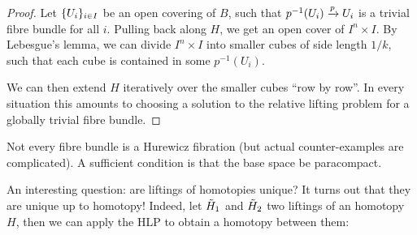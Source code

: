 \begin{proof}
Let $\{U_i\}_{i\in I}$ be an open covering of $B$, such that $p^{-1}(U_i)\xrightarrow{p}U_i$ is a trivial fibre bundle for all $i$. Pulling back along $H$, we get an open cover of $I^n\times I$. By Lebesgue's lemma, we can divide $I^n\times I$ into smaller cubes of side length $1/k$, such that each cube is contained in some $p^{-1}(U_i)$.
\medskip

We can then extend $H$ iteratively over the smaller cubes \enquote{row by row}. In every situation this amounts to choosing a solution to the relative lifting problem for a globally trivial fibre bundle.
\end{proof}

\begin{remark}
Not every fibre bundle is a Hurewicz fibration (but actual counter-examples are complicated). A sufficient condition is that the base space be paracompact.
\end{remark}

\begin{remark}

An interesting question: are liftings of homotopies unique? It turns out that they are unique up to homotopy! Indeed, let $\tilde H_1$ and $\tilde H_2$ two liftings of an homotopy $H$, then we can apply the HLP to obtain a homotopy between them: 
\begin{center}
    \qquad
\end{center}\normalmarginpar
\end{remark}

